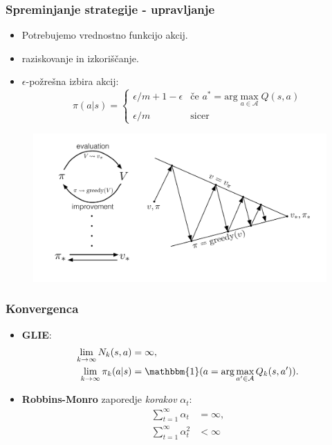 \documentclass{beamer}    %
\begin{document}
\begin{frame}
    \frametitle{Spreminjanje strategije - upravljanje}
    \begin{itemize}
        \item Potrebujemo vrednostno funkcijo akcij. 
        \item raziskovanje in izkoriščanje.
        \item $\epsilon$-požrešna izbira akcij:
        \begin{equation*}
            \pi(a|s) = \begin{cases}
                        \epsilon / m + 1 - \epsilon & \text{če } a^* = \text{arg}\max_{a \in 
                            \mathcal{A}} Q(s, a) \\
                            \epsilon / m & \text{sicer}
                       \end{cases}
        \end{equation*}
    \end{itemize}
    \begin{figure}
        \includegraphics[scale=0.2]{slike/policy-iteration.png}
    \end{figure}
\end{frame}


\begin{frame}
    \frametitle{Konvergenca}
    \begin{itemize}
        \item \textbf{GLIE}:
                \begin{align*}
                    \lim_{k \rightarrow \infty} N_k(s, a) &= \infty, \\
                    \lim_{k \rightarrow \infty} \pi_k(a|s) &= \mathbbm{1}(a =
                             \text{arg}\max_{a' \in \mathcal{A}}Q_k(s, a')).
                \end{align*}
        \item \textbf{Robbins-Monro} zaporedje \textit{korakov} $\alpha_t$:
                \begin{align*}
                    \sum_{t=1}^\infty \alpha_t &= \infty, \\
                    \sum_{t=1}^\infty \alpha_t^2 &< \infty
                \end{align*}
    \end{itemize}
\end{frame}
\end{document}
